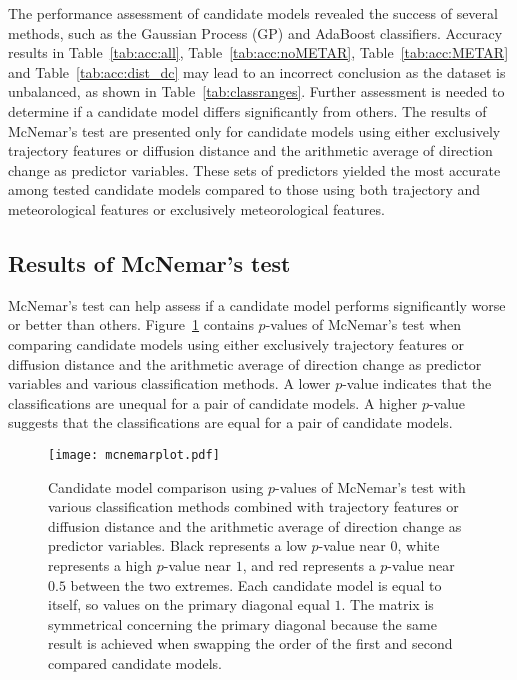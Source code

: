 \let\LaTeXcline\cline\documentclass[sn-mathphys-num]{sn-jnl}\let\cline\LaTeXcline
\begin{document}
The performance assessment of candidate models revealed the success of several methods, such as the Gaussian Process (GP) and AdaBoost classifiers. Accuracy results in Table~\ref{tab:acc:all}, Table~\ref{tab:acc:noMETAR}, Table~\ref{tab:acc:METAR} and Table~\ref{tab:acc:dist_dc} may lead to an incorrect conclusion as the dataset is unbalanced, as shown in Table~\ref{tab:classranges}. Further assessment is needed to determine if a candidate model differs significantly from others. The results of McNemar’s test are presented only for candidate models using either exclusively trajectory features or diffusion distance and the arithmetic average of direction change as predictor variables. These sets of predictors yielded the most accurate among tested candidate models compared to those using both trajectory and meteorological features or exclusively meteorological features.

\subsection{Results of McNemar's test}

McNemar’s test can help assess if a candidate model performs significantly worse or better than others. Figure~\ref{fig:mcnemarplot} contains $p$-values of McNemar's test when comparing candidate models using either exclusively trajectory features or diffusion distance and the arithmetic average of direction change as predictor variables and various classification methods. A lower $p$-value indicates that the classifications are unequal for a pair of candidate models. A higher $p$-value suggests that the classifications are equal for a pair of candidate models.

\begin{figure}[!ht]
 \centering
 \texttt{[image: mcnemarplot.pdf]}
    \caption{Candidate model comparison using $p$-values of McNemar's test with various classification methods combined with trajectory features or diffusion distance and the arithmetic average of direction change as predictor variables. Black represents a low $p$-value near $0$, white represents a high $p$-value near $1$, and red represents a $p$-value near $0.5$ between the two extremes. Each candidate model is equal to itself, so values on the primary diagonal equal $1$. The matrix is symmetrical concerning the primary diagonal because the same result is achieved when swapping the order of the first and second compared candidate models.}
    \label{fig:mcnemarplot}
\end{figure}
\end{document}
